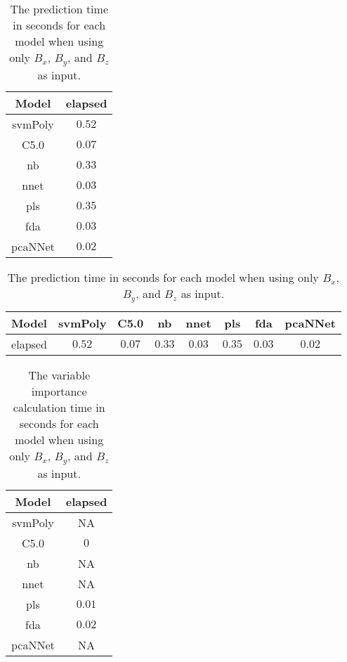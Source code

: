 \begin{table}[!ht]
	\centering
	\begin{tabular}{|c|c|}
		\hline
		Model & elapsed \\ \hline
		svmPoly & $0.52$ \\ \hline
		C5.0 & $0.07$ \\ \hline
		nb & $0.33$ \\ \hline
		nnet & $0.03$ \\ \hline
		pls & $0.35$ \\ \hline
		fda & $0.03$ \\ \hline
		pcaNNet & $0.02$ \\ \hline
	\end{tabular}
	\caption{The prediction time in seconds for each model when using only $B_{x}$, $B_{y}$, and $B_{z}$ as input.}
	\label{tab:time:coord:predict}
\end{table}

\begin{table}[!ht]
	\centering
	\begin{tabular}{|c|c|c|c|c|c|c|c|}
		\hline
		Model & svmPoly & C5.0 & nb & nnet & pls & fda & pcaNNet \\ \hline
		elapsed & $0.52$ & $0.07$ & $0.33$ & $0.03$ & $0.35$ & $0.03$ & $0.02$ \\ \hline
	\end{tabular}
	\caption{The prediction time in seconds for each model when using only $B_{x}$, $B_{y}$, and $B_{z}$ as input.}
	\label{tab:time:reverse:coord:predict}
\end{table}

\begin{table}[!ht]
	\centering
	\begin{tabular}{|c|c|}
		\hline
		Model & elapsed \\ \hline
		svmPoly & NA \\ \hline
		C5.0 & $0$ \\ \hline
		nb & NA \\ \hline
		nnet & NA \\ \hline
		pls & $0.01$ \\ \hline
		fda & $0.02$ \\ \hline
		pcaNNet & NA \\ \hline
	\end{tabular}
	\caption{The variable importance calculation time in seconds for each model when using only $B_{x}$, $B_{y}$, and $B_{z}$ as input.}
	\label{tab:time:coord:importance}
\end{table}


